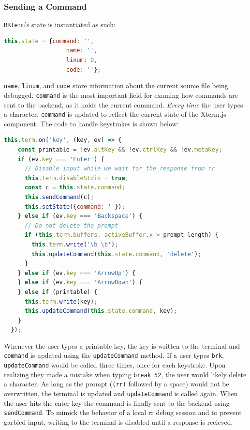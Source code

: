 \documentclass[12pt]{article}
\begin{document}
\subsubsection{Sending a Command}

\lstinline{RRTerm}'s state is instantiated as such:

\begin{lstlisting}[language=Javascript,basicstyle=\linespread{0.5}\ttfamily,caption={RRTerm's State},captionpos=b]
  this.state = {command: '',
                  name: '',
                  linum: 0,
                  code: ''};
\end{lstlisting}

\lstinline{name}, \lstinline{linum}, and \lstinline{code} store
information about the current source file being debugged.
\lstinline{command} is the most important field for examing how
commands are sent to the backend, as it holds the current command.
\textit{Every time} the user types a character, \lstinline{command} is
updated to reflect the current state of the Xterm.js component.  The
code to handle keystrokes is shown below:

\begin{lstlisting}[language=Javascript,basicstyle=\linespread{0.5}\ttfamily,caption={Handling Keystrokes},captionpos=b]
  this.term.on('key', (key, ev) => {
    const printable = !ev.altKey && !ev.ctrlKey && !ev.metaKey;
    if (ev.key === 'Enter') {
      // Disable input while we wait for the response from rr
      this.term.disableStdin = true;
      const c = this.state.command;
      this.sendCommand(c);
      this.setState({command: ''});
    } else if (ev.key === 'Backspace') {
      // Do not delete the prompt
      if (this.term.buffers._activeBuffer.x > prompt_length) {
        this.term.write('\b \b');
        this.updateCommand(this.state.command, 'delete');
      }
    } else if (ev.key === 'ArrowUp') {
    } else if (ev.key === 'ArrowDown') {
    } else if (printable) {
      this.term.write(key);
      this.updateCommand(this.state.command, key);
    }
  });
\end{lstlisting}

Whenever the user types a printable key, the key is written to the
terminal and \lstinline{command} is updated using the
\lstinline{updateCommand} method.  If a user types \lstinline{brk},
\lstinline{updateCommand} would be called three times, once for each
keystroke.  Upon realizing they made a mistake when typing
\lstinline{break 52}, the user would likely delete a character.  As
long as the prompt (\lstinline{(rr)} followed by a space) would not be
overwritten, the terminal is updated and \lstinline{updateCommand} is
called again.  When the user hits the enter key the command is finally
sent to the backend using \lstinline{sendCommand}.  To mimick the
behavior of a local rr debug session and to prevent garbled input,
writing to the terminal is disabled until a response is recieved.
\end{document}
